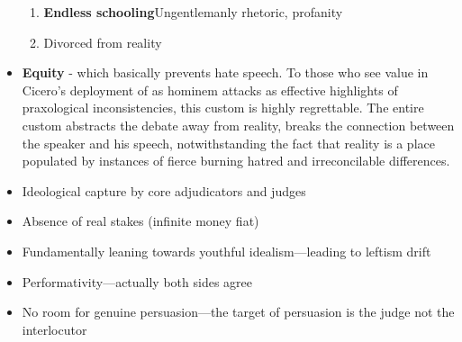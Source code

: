 \begin{itemize}
\begin{enumerate}
            \item \textbf{Endless schooling}Ungentlemanly rhetoric, profanity
            \item Divorced from reality
    
    
        \end{enumerate}
    


    \item \textbf{Equity} - which basically prevents hate speech. To those who see value in Cicero's deployment of as hominem attacks as effective highlights of praxological inconsistencies, this custom is highly regrettable. The entire custom abstracts the debate away from reality, breaks the connection between the speaker and his speech, notwithstanding the fact that reality is a place populated by instances of fierce burning hatred and irreconcilable differences.
    
        \item Ideological capture by core adjudicators and judges
        \item Absence of real stakes (infinite money fiat)
        \item Fundamentally leaning towards youthful idealism—leading to leftism drift
        \item Performativity—actually both sides agree 
        \item No room for genuine persuasion—the target of persuasion is the judge not the interlocutor
        

\end{itemize}
